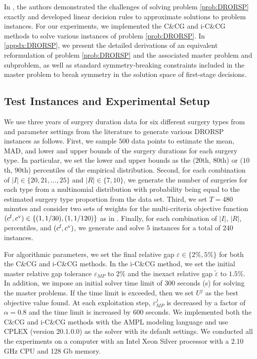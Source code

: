 \documentclass[preprint,review,11pt]{elsarticle}
\theoremstyle{definition}
\theoremstyle{remark}
\newcommand{\epst}{\widetilde{\varepsilon}}
\newcommand{\cf}{c^{\tiny{\textup{f}}}}
\newcommand{\cv}{c^{\tiny{\textup{v}}}}
\begin{document}
In \cite{Wang_et_al:2019}, the authors demonstrated the challenges of solving problem \eqref{prob:DRORSP} exactly and developed linear decision rules to approximate solutions to problem instances. For our experiments, we implemented the C\&CG and i-C\&CG methods to solve various instances of problem \eqref{prob:DRORSP}. In \ref{appdx:DRORSP}, we present the detailed derivations of an equivalent reformulation of problem \eqref{prob:DRORSP} and the associated master problem and subproblem, as well as standard symmetry-breaking constraints included in the master problem to break symmetry in the solution space of first-stage decisions. 




\subsection{Test Instances and Experimental Setup} \label{subsec:expt_setting}

We use three years of surgery duration data for six different surgery types from \cite{Mannino_et_al:2010} and parameter settings from the literature to generate various DRORSP instances as follows. First, we sample $500$ data points to estimate the mean, MAD, and lower and upper bounds of the surgery durations for each surgery type. In particular, we set the lower and upper bounds as the ($20$th, $80$th) or ($10$th, $90$th) percentiles of the empirical distribution. Second, for each combination of $|I|\in\{20, 21, \dots,25\}$ and $|R|\in\{7,10\}$, we generate the number of surgeries for each type from a multinomial distribution with probability being equal to the estimated surgery type proportion from the data set. Third, we set $T=480$ minutes and consider two sets of weights for the multi-criteria objective function $(\cf,\cv)\in\{(1,1/30),(1,1/120)\}$ as in \cite{Denton_et_al:2010}. Finally, for each combination of $|I|$, $|R|$, percentiles, and $(\cf,\cv)$, we generate and solve $5$ instances for a total of $240$ instances.

For algorithmic parameters, we set the final relative gap $\varepsilon\in\{2\%,5\%\}$ for both the C\&CG and i-C\&CG methods. In the i-C\&CG method, we set the initial master relative gap tolerance $\varepsilon_{MP}$ to $2\%$ and the inexact relative gap $\epst$ to $1.5\%$. In addition, we impose an initial solver time limit of $300$ seconds (s) for solving the master problems. If the time limit is exceeded, then we set $U^j$ as the best objective value found. At each exploitation step, $\varepsilon_{MP}^j$ is decreased by a factor of $\alpha=0.8$ and the time limit is increased by $600$ seconds. We implemented both the C\&CG and i-C\&CG methods with the AMPL modeling language and use CPLEX (version 20.1.0.0) as the solver with its default settings. We conducted all the experiments on a computer with an Intel Xeon Silver processor with a 2.10 GHz CPU and 128 Gb memory. 
\end{document}
